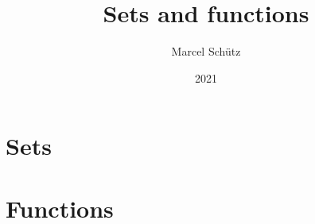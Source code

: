 \documentclass{article}
\title{Sets and functions}
\author{Marcel Schütz}
\date{2021}
\begin{document}
  \maketitle

  \tableofcontents

  \newpage
  \part{Sets}

  
  \begin{comment}
    \begin{forthel}
      \instruction{readtex set-theory/sections/01_sets/01_sets.ftl.tex}
    \end{forthel}
  \end{comment}

  \newpage
  
  \begin{comment}
    \begin{forthel}
      \instruction{readtex set-theory/sections/01_sets/02_powerset.ftl.tex}
    \end{forthel}
  \end{comment}

  \newpage
  
  \begin{comment}
    \begin{forthel}
      \instruction{readtex set-theory/sections/01_sets/03_regularity.ftl.tex}
    \end{forthel}
  \end{comment}

  \newpage
  
  \begin{comment}
    \begin{forthel}
      \instruction{readtex set-theory/sections/01_sets/04_symmetric-difference.ftl.tex}
    \end{forthel}
  \end{comment}

  \newpage
  
  \begin{comment}
    \begin{forthel}
      \instruction{readtex set-theory/sections/01_sets/05_cartesian-product.ftl.tex}
    \end{forthel}
  \end{comment}


  \newpage
  \part{Functions}
\end{document}
